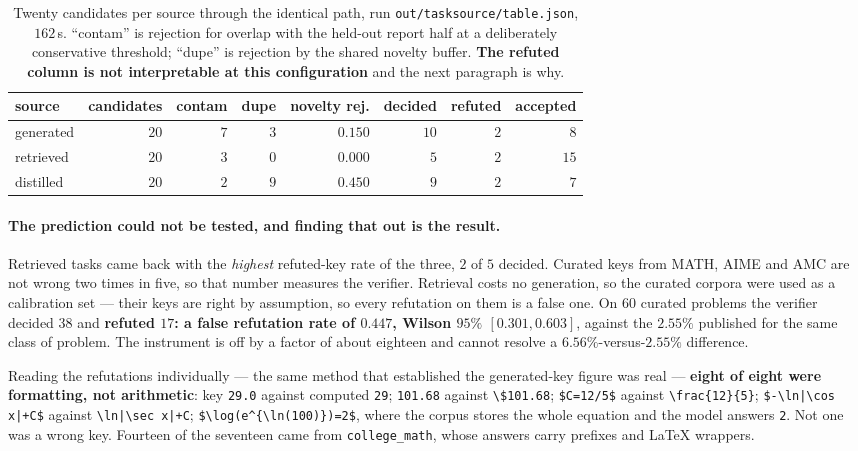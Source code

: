 \begin{table}[t]
\centering\small
\caption{Twenty candidates per source through the identical path, run
\texttt{out/tasksource/table.json}, $162$\,s. ``contam'' is rejection for overlap with the
held-out report half at a deliberately conservative threshold; ``dupe'' is rejection by the
shared novelty buffer. \textbf{The refuted column is not interpretable at this configuration}
and the next paragraph is why.}
\label{tab:tasksource}
\begin{tabular}{lrrrrrrr}
\toprule
source & candidates & contam & dupe & novelty rej. & decided & refuted & accepted \\
\midrule
generated & $20$ & $7$ & $3$ & $0.150$ & $10$ & $2$ & $8$ \\
retrieved & $20$ & $3$ & $0$ & $0.000$ & $5$  & $2$ & $15$ \\
distilled & $20$ & $2$ & $9$ & $0.450$ & $9$  & $2$ & $7$ \\
\bottomrule
\end{tabular}
\end{table}

\paragraph{The prediction could not be tested, and finding that out is the result.}
Retrieved tasks came back with the \emph{highest} refuted-key rate of the three, $2$ of $5$
decided. Curated keys from MATH, AIME and AMC are not wrong two times in five, so that number
measures the verifier. Retrieval costs no generation, so the curated corpora were used as a
calibration set --- their keys are right by assumption, so every refutation on them is a false
one. On $60$ curated problems the verifier decided $38$ and \textbf{refuted $17$: a false
refutation rate of $\mathbf{0.447}$, Wilson $95\%$ $[0.301, 0.603]$}, against the $2.55\%$
published for the same class of problem. The instrument is off by a factor of about eighteen
and cannot resolve a $6.56\%$-versus-$2.55\%$ difference.

Reading the refutations individually --- the same method that established the generated-key
figure was real --- \textbf{eight of eight were formatting, not arithmetic}: key
\texttt{29.0} against computed \texttt{29}; \texttt{101.68} against \texttt{\textbackslash\$101.68};
\texttt{\$C=12/5\$} against \texttt{\textbackslash frac\{12\}\{5\}};
\texttt{\$-\textbackslash ln|\textbackslash cos x|+C\$} against
\texttt{\textbackslash ln|\textbackslash sec x|+C}; \texttt{\$\textbackslash log(e\^{}\{\textbackslash ln(100)\})=2\$},
where the corpus stores the whole equation and the model answers \texttt{2}. Not one was a
wrong key. Fourteen of the seventeen came from \texttt{college\_math}, whose answers carry
prefixes and \LaTeX{} wrappers.

